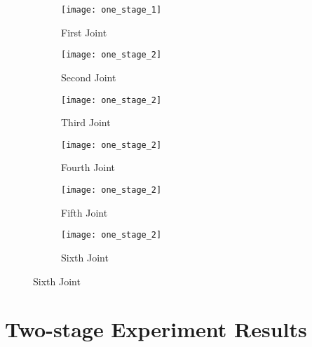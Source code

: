 \begin{figure}[H]
  \caption{ptimization using static friction}
  \begin{subfigure}[t]{0.5\textwidth}
    \centering
    \texttt{[image: one\_stage\_1]} 
    \caption{First Joint}
  \end{subfigure}
  \begin{subfigure}[t]{0.5\textwidth}
    \centering
    \texttt{[image: one\_stage\_2]}
    \caption{Second Joint}
  \end{subfigure}
  \begin{subfigure}[t]{0.5\textwidth}
    \centering
    \texttt{[image: one\_stage\_2]}
    \caption{Third Joint}
  \end{subfigure}
  \begin{subfigure}[t]{0.5\textwidth}
    \centering
    \texttt{[image: one\_stage\_2]}
    \caption{Fourth Joint}
  \end{subfigure}
  \begin{subfigure}[t]{0.5\textwidth}
    \centering
    \texttt{[image: one\_stage\_2]}
    \caption{Fifth Joint}
  \end{subfigure}
  \begin{subfigure}[t]{0.5\textwidth}
    \centering
    \texttt{[image: one\_stage\_2]}
    \caption{Sixth Joint}
  \end{subfigure}
\end{figure}


\section*{Two-stage Experiment Results}
